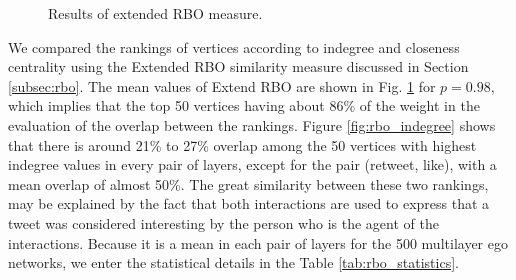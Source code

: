 \begin{figure}[ht]
    \centering
    \caption{Results of extended RBO measure.}
    \label{fig:net_struct_rbo}
\end{figure}



We compared the rankings of vertices according to indegree and closeness centrality using the Extended RBO similarity measure discussed in Section \ref{subsec:rbo}. The mean values of Extend RBO are shown in Fig. \ref{fig:net_struct_rbo} for $p=0.98$, which implies that the top 50 vertices having about 86\% of the weight in the evaluation of the overlap between the rankings. Figure \ref{fig:rbo_indegree} shows that there is around 21\% to 27\% overlap among the 50 vertices with highest indegree values in every pair of layers, except for the pair (retweet, like), with a mean overlap of almost 50\%. The great similarity between these two rankings, may be explained by the fact that both interactions  are used to express that a tweet was considered interesting by the person who is the agent of the interactions. Because it is a mean in each pair of layers for the 500 multilayer ego networks, we enter the statistical details in the Table \ref{tab:rbo_statistics}.


